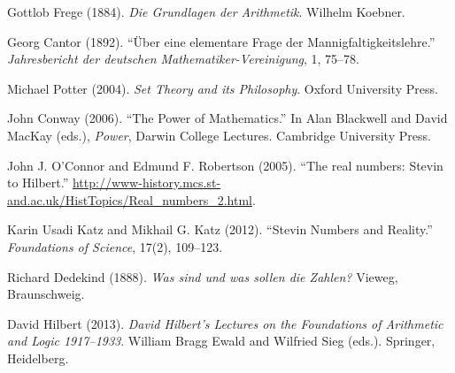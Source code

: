 \documentclass[11pt,a4paper,openany]{book}
\theoremstyle{definition}
\begin{document}
\par\medskip
Gottlob Frege (1884). \textit{Die Grundlagen der Arithmetik}.
Wilhelm Koebner.

Georg Cantor (1892). ``Über eine elementare Frage der
Mannigfaltigkeitslehre.'' \textit{Jahresbericht der deutschen
Mathematiker-Vereinigung}, 1, 75--78.

Michael Potter (2004). \textit{Set Theory and its Philosophy}.
Oxford University Press.

John Conway (2006). ``The Power of Mathematics.'' In Alan Blackwell
and David MacKay (eds.), \textit{Power}, Darwin College Lectures.
Cambridge University Press.

John J. O'Connor and Edmund F. Robertson (2005). ``The real numbers:
Stevin to Hilbert.''
\url{http://www-history.mcs.st-and.ac.uk/HistTopics/Real_numbers_2.html}.

Karin Usadi Katz and Mikhail G. Katz (2012). ``Stevin Numbers and
Reality.'' \textit{Foundations of Science}, 17(2), 109--123.

Richard Dedekind (1888). \textit{Was sind und was sollen die Zahlen?}
Vieweg, Braunschweig.

David Hilbert (2013). \textit{David Hilbert's Lectures on the Foundations
of Arithmetic and Logic 1917--1933}. William Bragg Ewald and Wilfried Sieg
(eds.). Springer, Heidelberg.
\end{document}
